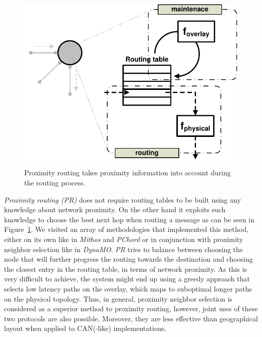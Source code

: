 \begin{figure}[ht]
\centering
  \includegraphics[scale=0.4]{img/pdf/proximity-routing.pdf}
\caption{Proximity routing takes proximity information into account during the
routing process.}
\label{figure:proximity-routing}
\end{figure}

\emph{Proximity routing (PR)} does not require routing tables to be built using any
knowledge about network proximity. On the other hand it exploits such knowledge
to choose the best next hop when routing a message as can be seen in
Figure~\ref{figure:proximity-routing}. We visited an array of methodologies that
implemented this method, either on its own like in \emph{Mithos} and
\emph{PChord} or in conjunction with proximity neighbor selection like in
\emph{DynaMO}. \emph{PR} tries to balance between choosing the node that will
further progress the routing towards the destination and choosing the closest
entry in the routing table, in terms of network proximity. As this is very
difficult to achieve, the system might end up
using a greedy approach that selects low latency paths on the overlay, which
maps to suboptimal longer paths on the physical topology. Thus, in general,
proximity neighbor selection is considered as a superior method to proximity
routing, however, joint uses of these two protocols are also possible. Moreover,
they are less effective than geographical layout when applied to CAN(-like)
implementations.



